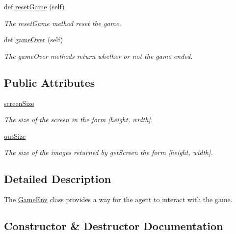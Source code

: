 \begin{DoxyCompactItemize}
def \hyperlink{classDQN-Deepmind-NIPS-2013_1_1GameEnv_1_1GameEnv_afc780b83378b9d19d9dba64711e5c2ed}{reset\+Game} (self)
\begin{DoxyCompactList}\small\item\em The reset\+Game method reset the game. \end{DoxyCompactList}\item 
def \hyperlink{classDQN-Deepmind-NIPS-2013_1_1GameEnv_1_1GameEnv_a1ccc35e029e05910c3c25ffa602e442b}{game\+Over} (self)
\begin{DoxyCompactList}\small\item\em The game\+Over methods return whether or not the game ended. \end{DoxyCompactList}\end{DoxyCompactItemize}
\subsection*{Public Attributes}
\begin{DoxyCompactItemize}
\item 
\hyperlink{classDQN-Deepmind-NIPS-2013_1_1GameEnv_1_1GameEnv_a2dedb2f4e5f0f1b7da2970ac89a5b544}{screen\+Size}
\begin{DoxyCompactList}\small\item\em The size of the screen in the form \mbox{[}height, width\mbox{]}. \end{DoxyCompactList}\item 
\hyperlink{classDQN-Deepmind-NIPS-2013_1_1GameEnv_1_1GameEnv_ae8e7e56bd996ea0ce4ece1ca32f6b54a}{out\+Size}
\begin{DoxyCompactList}\small\item\em The size of the images returned by get\+Screen the form \mbox{[}height, width\mbox{]}. \end{DoxyCompactList}\end{DoxyCompactItemize}


\subsection{Detailed Description}
The \hyperlink{classDQN-Deepmind-NIPS-2013_1_1GameEnv_1_1GameEnv}{Game\+Env} class provides a way for the agent to interact with the game. 

\subsection{Constructor \& Destructor Documentation}
\hypertarget{classDQN-Deepmind-NIPS-2013_1_1GameEnv_1_1GameEnv_a787af9d0e467c038e970246ae4dfdc08}{}\label{classDQN-Deepmind-NIPS-2013_1_1GameEnv_1_1GameEnv_a787af9d0e467c038e970246ae4dfdc08} 
